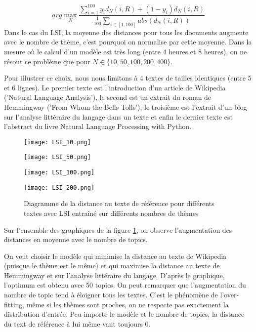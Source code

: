 \documentclass[12pt]{article}
\begin{document}
$$ arg\max_{N} \frac{\sum_{i=1}^{100} {y_i d_N(i,R) + (1-y_i) d_N(i,R)}}{\frac{1}{100}\sum_{i\in[1,100]} abs(d_N(i,R))}$$
Dans le cas du LSI, la moyenne des distances pour tous les documents augmente avec le nombre de thème, c'est pourquoi on normalise par cette moyenne. Dans la mesure où le calcul d'un modèle est très long (entre 4 heures et 8 heures), on ne résout ce problème que pour $N\in \{10,50,100,200,400\}$.

\noindent
Pour illustrer ce choix, nous nous limitons à 4 textes de tailles identiques (entre 5 et 6 lignes). Le premier texte est l'introduction d'un article de Wikipedia ('Natural Language Analysis'), le second est un extrait du roman de Hemmingway ('From Whom the Bells Tolls'), le troisième est l'extrait d'un blog sur l'analyse littéraire du langage dans un texte et enfin le dernier texte est l'abstract du livre Natural Language Processing with Python.


\begin{figure}
    \caption{Diagramme de la distance au texte de référence pour différents textes avec LSI entraîné sur différents nombres de thèmes}
    \label{graphes}
    \begin{minipage}[c]{.46\linewidth}
        \centering
        \texttt{[image: LSI\_10.png]}
    \end{minipage}
    \hfill%
    \begin{minipage}[c]{.46\linewidth}
        \centering
        \texttt{[image: LSI\_50.png]}
    \end{minipage}



    \begin{minipage}[c]{.46\linewidth}
        \centering
        \texttt{[image: LSI\_100.png]}

    \end{minipage}
    \hfill%
    \begin{minipage}[c]{.46\linewidth}
        \centering
        \texttt{[image: LSI\_200.png]}

    \end{minipage}
\end{figure}

\noindent
Sur l'ensemble des graphiques de la figure \ref{graphes}, on observe l'augmentation des distances en moyenne avec le nombre de topics. 

\noindent
On veut choisir le modèle qui minimise la distance au texte de Wikipedia (puisque le thème est le même) et qui maximise la distance au texte de Hemmingway et sur l'analyse littéraire du langage. D'après le graphique, l'optimum est obtenu avec 50 topics. On peut remarquer que l'augmentation du nombre de topic tend à éloigner tous les textes. C'est le phénomène de l'over-fitting, même si les thèmes sont proches, on ne respecte pas exactement la distribution d'entrée.
Peu importe le modèle et le nombre de topics, la distance du text de référence à lui même vaut toujours 0.
\end{document}
